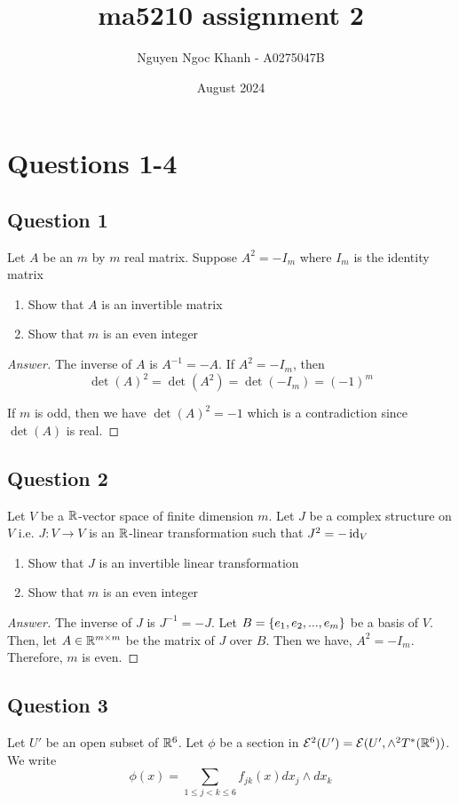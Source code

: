 \documentclass{article}
\title{ma5210 assignment 2}
\author{Nguyen Ngoc Khanh - A0275047B}
\date{August 2024}
\begin{document}
\maketitle

\section{Questions 1-4}

\subsection{Question 1}
Let $A$ be an $m$ by $m$ real matrix. Suppose $A^2 = -I_m$ where $I_m$ is the identity matrix
\begin{enumerate}
    \item Show that $A$ is an invertible matrix
    \item Show that $m$ is an even integer
\end{enumerate}

\begin{proof}[Answer]
The inverse of $A$ is $A^{-1} = -A$. If $A^2 = -I_m$, then 
$$
    \det(A)^2 = \det(A^2) = \det(-I_m) = (-1)^m
$$

If $m$ is odd, then we have $\det(A)^2 = -1$ which is a contradiction since $\det(A)$ is real.
\end{proof}

\subsection{Question 2}

Let $V$ be a $\mathbb{R}$-vector space of finite dimension $m$. Let $J$ be a complex structure on $V$ i.e. $J: V \to V$ is an $\mathbb{R}$-linear transformation such that $J^2 = -\operatorname{id}_V$

\begin{enumerate}
    \item Show that $J$ is an invertible linear transformation
    \item Show that $m$ is an even integer
\end{enumerate}

\begin{proof}[Answer]
The inverse of $J$ is $J^{-1} = -J$. Let $B = \{e_1, e_2, ..., e_m\}$ be a basis of $V$. Then, let $A \in \mathbb{R}^{m \times m}$ be the matrix of $J$ over $B$. Then we have, $A^2 = -I_m$. Therefore, $m$ is even.
\end{proof}

\subsection{Question 3}
Let $U'$ be an open subset of $\mathbb{R}^6$. Let $\phi$ be a section in $\mathcal{E}^2(U') = \mathcal{E}(U', \wedge^2 T^*(\mathbb{R}^6))$. We write
$$
    \phi(x) = \sum_{1 \leq j < k \leq 6} f_{jk}(x) dx_j \wedge dx_k
$$
\end{document}
